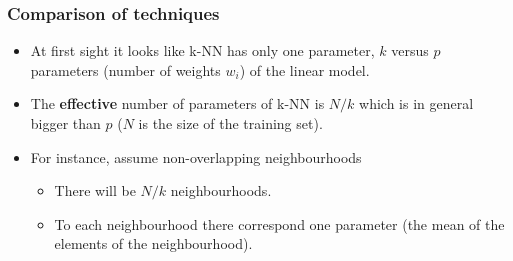 \documentclass[notes]{beamer}          %
\newif\iffull
\begin{document}
\iffull
\begin{frame}
\frametitle{Comparison of the techniques}
    \begin{itemize}
        \item 15-NN seems to work better than the linear classifier since fewer points are missclassified.
        \item On the other hand, {\bf none} of the points in the 1-NN case was misclassified!?
        \item Actually with the 1-NN method the error on {\bf training data} is always 0.
        \item An independent test set needed to obtain a better comparison of the methods.
    \end{itemize}
\end{frame}
\fi


\begin{frame}
\frametitle{Comparison of techniques}

    \begin{itemize}
        \item At first sight it looks like k-NN has only one parameter, $k$ versus $p$ parameters (number of weights $w_i$) of the linear model.
        \item The {\bf effective}  number of parameters of k-NN is $N/k$ which is in general bigger than $p$ ($N$ is the size of the training set).
        \item For instance, assume non-overlapping neighbourhoods
            \begin{itemize}
                \item There will be $N/k$ neighbourhoods.
                \item To each neighbourhood there correspond one parameter (the mean of the elements of the neighbourhood).
            \end{itemize}
    \end{itemize}

\end{frame}

\iffull
\begin{frame}
\frametitle{Discussion point 2}
Assume that you are building a machine learning model to be used as an \textit{aid} by clinicians for decision making. The inputs to the model are a number of \textit{biomarkers} describing the condition of the patient.
\\~\

The clinician specifies that they are interested in a model that is \textit{interpretable}, i.e. a model that will not only output a prediction but also give an indication about which biomarkers are important when making the prediction.
\\~\

You can either use a linear model or a $k$-NN classifier. What is the better choice in your opinion?

\end{frame}
\fi
\end{document}
